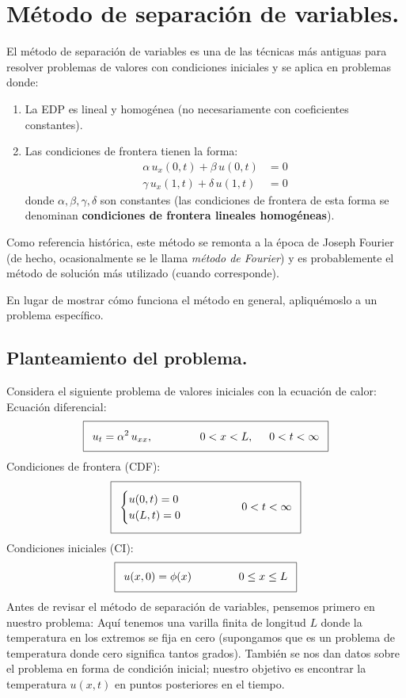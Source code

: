 \section{Método de separación de variables.}
El método de separación de variables es una de las técnicas más antiguas para resolver problemas de valores con condiciones iniciales y se aplica en problemas donde:
\begin{enumerate}
\item La EDP es lineal y homogénea (no necesariamente con coeficientes constantes).
\item Las condiciones de frontera tienen la forma:
\begin{align*}
\alpha \, u_{x} (0, t) + \beta \, u(0, t) &= 0 \\
\gamma \, u_{x} (1, t) + \delta \, u(1, t) &= 0
\end{align*}
donde $\alpha, \beta, \gamma, \delta$ son constantes (las condiciones de frontera de esta forma se denominan \textbf{condiciones de frontera lineales homogéneas}).
\end{enumerate}
Como referencia histórica, este método se remonta a la época de Joseph Fourier (de hecho, ocasionalmente se le llama \emph{método de Fourier}) y es probablemente el método de solución más utilizado (cuando corresponde).
\par
En lugar de mostrar cómo funciona el método en general, apliquémoslo a un problema específico.
\subsection{Planteamiento del problema.}
Considera el siguiente problema de valores iniciales con la ecuación de calor:
\\
Ecuación diferencial:
\begin{align*}
\addtolength{\fboxsep}{5pt}\boxed{ u_{t} = \alpha^{2} \, u_{xx}, \hspace{1.5cm} 0 < x < L,\hspace{0.5cm} 0 < t < \infty}
\end{align*}
Condiciones de frontera (CDF):
\begin{align*}
\addtolength{\fboxsep}{5pt}\boxed{
\begin{cases}
u(0, t) = 0 \\
u(L, t) = 0
\end{cases}
\hspace{1.5cm}
0 < t < \infty }
\end{align*}
Condiciones iniciales (CI):
\begin{align*}
\addtolength{\fboxsep}{5pt}\boxed{
u(x, 0) = \phi (x) \hspace{1.5cm} 0 \leq x \leq L
}
\end{align*}
Antes de revisar el método de separación de variables, pensemos primero en nuestro problema: Aquí tenemos una varilla finita de longitud $L$ donde la temperatura en los extremos se fija en cero (supongamos que es un problema de temperatura donde cero significa tantos grados). También se nos dan datos sobre el problema en forma de condición inicial; nuestro objetivo es encontrar la temperatura $u (x, t)$ en puntos posteriores en el tiempo.

